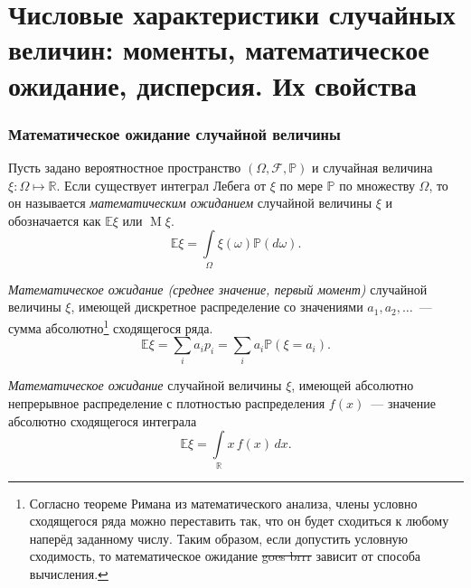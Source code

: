 \section{Числовые характеристики случайных величин: моменты, математическое ожидание, дисперсия. Их свойства}

\subsubsection{Математическое ожидание случайной величины}

\begin{defn}
    Пусть задано вероятностное пространство $(\Omega, \mathcal{F}, \mathbb{P})$ и случайная величина $\xi \colon \Omega \mapsto \mathbb{R}$. 
    Если существует интеграл Лебега от $\xi$ по мере $\mathbb{P}$ по множеству $\Omega$, то он называется \textit{математическим ожиданием} случайной величины $\xi$ и обозначается как $\mathbb{E}\xi$ или $\operatorname{M} \! \xi$.
    \begin{equation*}
        \mathbb{E}\xi = \int\limits_{\Omega} \xi(\omega) \mathbb{P}(d\omega).
    \end{equation*}
\end{defn}

\begin{defn}
    \textit{Математическое ожидание (среднее значение, первый момент)} случайной величины $\xi$, 
    имеющей дискретное распределение со значениями $a_1, a_2, \ldots$~--- сумма абсолютно\footnote{Согласно теореме Римана из математического анализа, члены условно сходящегося ряда можно переставить так, что он будет сходиться к любому наперёд заданному числу. 
        Таким образом, если допустить условную сходимость, то математическое ожидание \sout{goes brrr} зависит от способа вычисления.} 
    сходящегося ряда.
    \begin{equation*}
        \mathbb{E} \xi=\sum\limits_{i} a_{i} p_{i}=\sum\limits_{i} a_{i} \mathbb{P}(\xi=a_{i}).
    \end{equation*}
\end{defn}

\begin{defn}
    \textit{Математическое ожидание} случайной величины $\xi$, имеющей абсолютно непрерывное распределение с плотностью распределения $f(x)$~--- значение абсолютно сходящегося интеграла
    \begin{equation*}
        \mathbb{E} \xi=\int\limits_{\mathbb{R}} x \, f(x) \, dx.
    \end{equation*}
\end{defn}

